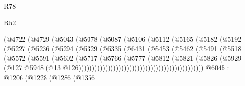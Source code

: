 \begin{lexlean}{R78}
\begin{lexlean}{R52}
\begin{coremodule}
{{{{{{{{{{{{{{{{{{{{{{{{{{{{{{{{{{{{{{{{{{{{{{{{{{{{{{{{{{{{{{{{{{{{{{{{{{{{{{{{{{{{{{{{{{{{{{{{{{{{{{{{{{{{{{{{{{{{{{{{{{{{{{{{{{{{{{{{{{{{{{{{{{{{{{{{{{{{{{{{{{{{{{{{{{{{{{{{{{{{{{{{{{{{{{{{{{{{{{                                  (@4722
                                    (@4729
                                      (@5043
                                        (@5078
                                          (@5087
                                            (@5106
                                              (@5112
                                                (@5165
                                                  (@5182
                                                    (@5192
                                                      (@5227
                                                        (@5236
                                                          (@5294
                                                            (@5329
                                                              (@5335
                                                                (@5431
                                                                  (@5453
                                                                    (@5462
                                                                      (@5491
                                                                        (@5518
                                                                          (@5572
                                                                            (@5591
                                                                              (@5602
                                                                                (@5717
                                                                                  (@5766
                                                                                    (@5777
                                                                                      (@5812
                                                                                        (@5821
                                                                                          (@5826
                                                                                            (@5929
                                                                                              (@127
                                                                                                @5948
                                                                                                (@13
                                                                                                  @126)))))))))))))))))))))))))))))))))))))))))))))))
@6045 := @1206
    (@1228
      (@1286
        (@1356
}}}}}}}}}}}}}}}}}}}}}}}}}}}}}}}}}}}}}}}}}}}}}}}}}}}}}}}}}}}}}}}}}}}}}}}}}}}}}}}}}}}}}}}}}}}}}}}}}}}}}}}}}}}}}}}}}}}}}}}}}}}}}}}}}}}}}}}}}}}}}}}}}}}}}}}}}}}}}}}}}}}}}}}}}}}}}}}}}}}}}}}}}}}}}}}}}}}}}}
\end{coremodule}
\end{lexlean}
\end{lexlean}
